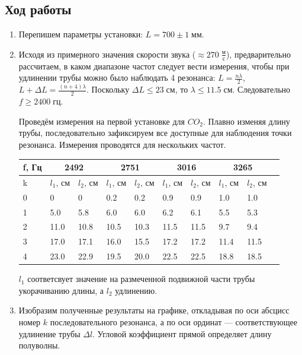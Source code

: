 \documentclass[a4paper,12pt]{article}
\begin{document}
	\subsection{Ход работы}
	\begin{enumerate}
		\item Перепишем параметры установки:
		$L = 700\pm1 \; {мм}.$
		\item  
		
		Исходя из примерного значения скорости звука ($ \approx 270 \; \frac{м}{с}$), предварительно рассчитаем, в каком диапазоне частот следует вести измерения, чтобы при удлинении трубы можно было наблюдать 4 резонанса:
$L = \frac{n\lambda}{2}$, $L + \Delta L = \frac{(n+4)\lambda}{2}$. Поскольку $\Delta L \leq 23 \; {см}$, то $\lambda \leq 11.5 \; {см}$. Следовательно $f \geq 2400 \; {гц}. $
		
		Проведём измерения на первой установке для $CO_2$.
		Плавно изменяя длину трубы, последовательно зафиксируем все доступные для наблюдения точки резонанса. Измерения проводятся для нескольких частот.
		\begin{center}
		\begin{tabular}{|l|l|l|l|l|l|l|l|l|l|}
			\hline
			f, Гц & \multicolumn{2}{|c|}{2492} & \multicolumn{2}{|c|}{2751}&  \multicolumn{2}{|c|}{3016} & \multicolumn{2}{|c|}{3265}
			\\
			\hline
			k &  $l_1$, см& $l_2$, см & $l_1$, см & $l_2$, см & $l_1$, см & $l_2$, см & $l_1$, см & $l_2$, см
			\\
			
			\hline
			0 & 0 & 0 & 0.2 & 0.2 & 0.9 & 0.9 & 1.0 & 1.0
			\\
			\hline
			1 & 5.0 & 5.8 & 6.0 & 6.0 & 6.2 &  6.1 & 5.5 & 5.3
			\\
			\hline
			2 & 11.0 & 10.8 & 10.5 & 10.3 & 11.5 & 11.5 & 9.7 & 9.4
			\\
			\hline
			3 & 17.0 & 17.1 & 16.0 & 15.5 & 17.2 & 17.2 & 11.4 & 11.5
			\\
			\hline
			4 & 23.0 & 22.9 & 19.5 & 20.0 & 22.5 & 22.5 & 18.8 & 18.5
			\\
			\hline
		\end{tabular}
		\end{center}
		$l_1$ соответсвует значение на размеченной подвижной части трубы укорачиванию длины, а $l_2$ удлинению.
		\item Изобразим полученные результаты на графике, откладывая по оси абсцисс номер $k$ последовательного резонанса, а по оси ординат — соответствующее удлинение трубы
		$\Delta l$. Угловой коэффициент прямой определяет длину полуволны.
		

\end{enumerate}
\end{document}
